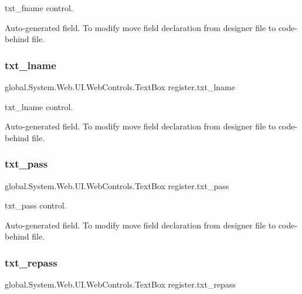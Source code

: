 txt\+\_\+fname control. 

Auto-\/generated field. To modify move field declaration from designer file to code-\/behind file. \mbox{\label{classregister_a18afcdd13cf247eabeea2657f5ee0f05}} 
\subsubsection{\texorpdfstring{txt\_lname}{txt\_lname}}
{\footnotesize\ttfamily global.\+System.\+Web.\+U\+I.\+Web\+Controls.\+Text\+Box register.\+txt\+\_\+lname\hspace{0.3cm}{\ttfamily [protected]}}



txt\+\_\+lname control. 

Auto-\/generated field. To modify move field declaration from designer file to code-\/behind file. \mbox{\label{classregister_aa6bb60e9fd1dfe3b087cc4c3b98a55ed}} 
\subsubsection{\texorpdfstring{txt\_pass}{txt\_pass}}
{\footnotesize\ttfamily global.\+System.\+Web.\+U\+I.\+Web\+Controls.\+Text\+Box register.\+txt\+\_\+pass\hspace{0.3cm}{\ttfamily [protected]}}



txt\+\_\+pass control. 

Auto-\/generated field. To modify move field declaration from designer file to code-\/behind file. \mbox{\label{classregister_a22b98218296acba49b2a560998df1533}} 
\subsubsection{\texorpdfstring{txt\_repass}{txt\_repass}}
{\footnotesize\ttfamily global.\+System.\+Web.\+U\+I.\+Web\+Controls.\+Text\+Box register.\+txt\+\_\+repass\hspace{0.3cm}{\ttfamily [protected]}}



